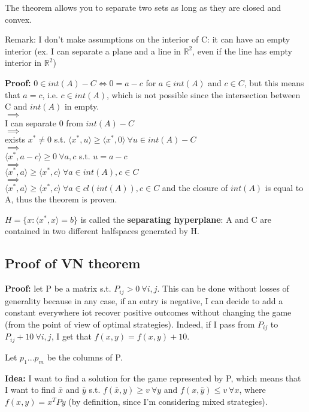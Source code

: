 \bigskip
\noindent The theorem allows you to separate two sets as long as they are 
closed and convex.

\noindent Remark: I don't make assumptions on the interior of C: it can have an
empty interior (ex. I can separate a plane and a line in $\mathbb{R}^2$, even
if the line has empty interior in $\mathbb{R}^2$)

\bigskip
\noindent \textbf{Proof:} $0 \in int(A)-C \iff 0 = a-c$ for $a \in int(A)$ and 
$c \in C$, but
this means that $a = c$, i.e. $c \in int(A)$, which is not possible since
the intersection between C and $int(A)$ in empty.\\
$\implies$\\
I can separate 0 from $int(A)-C$\\
$\implies$\\
exists $x^* \neq 0$ s.t. 
$\langle x^*,u \rangle \geq \langle x^*,0 \rangle ~\forall u \in int(A)-C$\\
$\implies$\\
$\langle x^*, a-c  \rangle \geq 0 ~\forall a,c$ s.t. $u=a-c$\\
$\implies$\\
$\langle x^*,a \rangle \geq \langle x^*,c \rangle ~\forall a \in int(A),
c \in C$\\
$\implies$\\
$\langle x^*,a \rangle \geq \langle x^*,c \rangle ~\forall a \in cl(int(A)),
c \in C$ and the closure of $int(A)$ is equal to A, thus the theorem is proven.

\bigskip
\noindent $H = \{x: \langle x^*,x \rangle = b\}$ is called the 
\textbf{separating hyperplane}: A and C are contained in two different 
halfspaces generated by H.

\bigskip
\subsection*{Proof of VN theorem}

\noindent \textbf{Proof:} let P be a matrix s.t. $P_{ij} > 0 
~\forall i,j$. This can be done without losses of generality because in any 
case, if an entry is negative, I can decide to add 
a constant everywhere iot recover positive outcomes without changing the 
game (from the point of view of optimal strategies). Indeed, if I pass 
from $P_{ij}$ to $P_{ij}+10 ~\forall i,j$, I get that $f(x,y)=f(x,y)+10$.

\noindent Let $p_1...p_m$ be the columns of P.

\noindent \textbf{Idea:} I want to find a solution for the game represented 
by P, which means that I want to find $\bar{x}$ and $\bar{y}$ s.t. 
$f(\bar{x},y) \geq v~\forall y$ and $f(x,\bar{y}) \leq v ~\forall x$, where 
$f(x,y) = x^TPy$ (by definition, since I'm considering mixed strategies).

